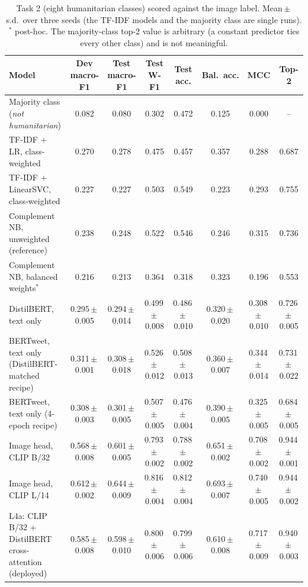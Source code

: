 \documentclass[conference]{IEEEtran}
\newcommand{\pmse}[2]{#1\,$\pm$\,#2}
\begin{document}
\begin{table}[t]
\centering
\caption{Task 2 (eight humanitarian classes) scored against the image label. Mean\,$\pm$\,s.d.\ over three seeds (the TF-IDF models and the majority class are single runs). $^\ast$ post-hoc. The majority-class top-2 value is arbitrary (a constant predictor ties every other class) and is not meaningful.}
\label{tab:t2explore}
\footnotesize
\setlength{\tabcolsep}{3pt}
\begin{tabular}{lccccccc}
\toprule
Model & Dev macro-F1 & Test macro-F1 & Test W-F1 & Test acc. & Bal.\ acc. & MCC & Top-2 \\
\midrule
Majority class (\emph{not humanitarian}) & 0.082 & 0.080 & 0.302 & 0.472 & 0.125 & 0.000 & -- \\
TF-IDF + LR, class-weighted & 0.270 & 0.278 & 0.475 & 0.457 & 0.357 & 0.288 & 0.687 \\
TF-IDF + LinearSVC, class-weighted & 0.227 & 0.227 & 0.503 & 0.549 & 0.223 & 0.293 & 0.755 \\
Complement NB, unweighted (reference) & 0.238 & 0.248 & 0.522 & 0.546 & 0.246 & 0.315 & 0.736 \\
Complement NB, balanced weights$^\ast$ & 0.216 & 0.213 & 0.364 & 0.318 & 0.323 & 0.196 & 0.553 \\
DistilBERT, text only & \pmse{0.295}{0.005} & \pmse{0.294}{0.014} & \pmse{0.499}{0.008} & \pmse{0.486}{0.010} & \pmse{0.320}{0.020} & \pmse{0.308}{0.010} & \pmse{0.726}{0.005} \\
BERTweet, text only (DistilBERT-matched recipe) & \pmse{0.311}{0.001} & \pmse{0.308}{0.018} & \pmse{0.526}{0.012} & \pmse{0.508}{0.013} & \pmse{0.360}{0.007} & \pmse{0.344}{0.014} & \pmse{0.731}{0.022} \\
BERTweet, text only (4-epoch recipe) & \pmse{0.308}{0.003} & \pmse{0.301}{0.005} & \pmse{0.507}{0.005} & \pmse{0.476}{0.004} & \pmse{0.390}{0.005} & \pmse{0.325}{0.005} & \pmse{0.684}{0.005} \\
Image head, CLIP B/32 & \pmse{0.568}{0.008} & \pmse{0.601}{0.005} & \pmse{0.793}{0.002} & \pmse{0.788}{0.002} & \pmse{0.651}{0.002} & \pmse{0.708}{0.002} & \pmse{0.944}{0.001} \\
Image head, CLIP L/14 & \pmse{0.612}{0.002} & \pmse{0.644}{0.009} & \pmse{0.816}{0.004} & \pmse{0.812}{0.004} & \pmse{0.693}{0.007} & \pmse{0.740}{0.005} & \pmse{0.944}{0.002} \\
L4a: CLIP B/32 + DistilBERT cross-attention (deployed) & \pmse{0.585}{0.008} & \pmse{0.598}{0.010} & \pmse{0.800}{0.006} & \pmse{0.799}{0.006} & \pmse{0.610}{0.008} & \pmse{0.717}{0.009} & \pmse{0.940}{0.003} \\

\end{tabular}
\end{table}
\end{document}
